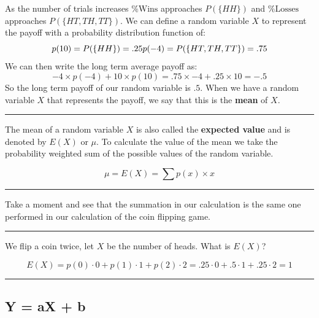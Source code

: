 \documentclass[
]{book}
\theoremstyle{definition}
\theoremstyle{definition}
\theoremstyle{definition}
\theoremstyle{remark}
\let\BeginKnitrBlock\begin \let\EndKnitrBlock\end
\begin{document}
As the number of trials increases \(\% \text{Wins}\) approaches \(P(\{HH\})\) and \(\% \text{Losses}\) approaches \(P(\{HT,TH,TT\})\). We can define a random variable \(X\) to represent the payoff with a probability distribution function of:
\[p(10) = P(\{HH\}) = .25 \\ p(-4) = P(\{HT,TH,TT\})=.75\]
We can then write the long term average payoff as:
\[{-4} \times p({-4})+10 \times p(10) = .75 \times {-4} + .25 \times 10=-.5\]
So the long term payoff of our random variable is \(.5\). When we have a random variable \(X\) that represents the payoff, we say that this is the \textbf{mean} of \(X\).

\begin{center}\rule{0.5\linewidth}{0.5pt}\end{center}

\BeginKnitrBlock{definition}[Expected Value]
\protect\hypertarget{def:expectedvalue}{}{\label{def:expectedvalue} {} }The mean of a random variable \(X\) is also called the \textbf{expected value} and is denoted by \(E(X)\) or \(\mu\). To calculate the value of the mean we take the probability weighted sum of the possible values of the random variable.

\[ \mu = E(X) = \sum p(x) \times x\]
\EndKnitrBlock{definition}

\begin{center}\rule{0.5\linewidth}{0.5pt}\end{center}

Take a moment and see that the summation in our calculation is the same one performed in our calculation of the coin flipping game.

\begin{center}\rule{0.5\linewidth}{0.5pt}\end{center}

\BeginKnitrBlock{example}[Average Heads]
\protect\hypertarget{exm:unnamed-chunk-13}{}{\label{exm:unnamed-chunk-13} {} }We flip a coin twice, let \(X\) be the number of heads. What is \(E(X)\)?

\[E(X) = p(0) \cdot 0 + p(1) \cdot 1 + p(2) \cdot 2 = .25 \cdot 0 + .5 \cdot 1 + .25 \cdot 2 = 1\]
\EndKnitrBlock{example}

\begin{center}\rule{0.5\linewidth}{0.5pt}\end{center}

\hypertarget{y-ax-b}{%
\subsection{Y = aX + b}\label{y-ax-b}}
\end{document}
